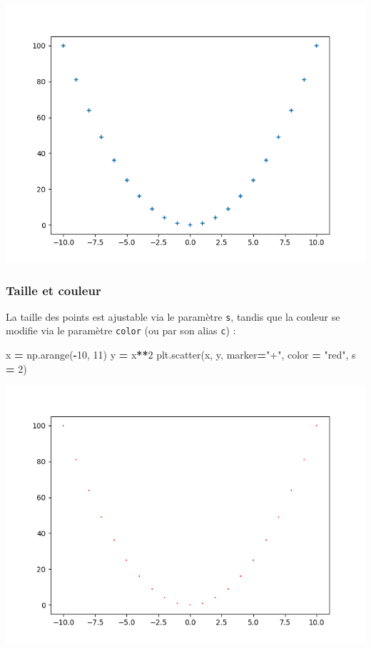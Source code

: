 \documentclass[12pt,]{book}
\newenvironment{Shaded}{\begin{snugshade}}{\end{snugshade}}
\newcommand{\DecValTok}[1]{\textcolor[rgb]{0.00,0.00,0.81}{#1}}
\newcommand{\StringTok}[1]{\textcolor[rgb]{0.31,0.60,0.02}{#1}}
\newcommand{\OperatorTok}[1]{\textcolor[rgb]{0.81,0.36,0.00}{\textbf{#1}}}
\newcommand{\NormalTok}[1]{#1}
\numberwithin{equation}{section}
\numberwithin{countremarque}{section}
\begin{document}
\begin{center}\includegraphics[width=9.03in]{figs/pyplot/scatter_2} \end{center}

\subsubsection{Taille et couleur}\label{taille-et-couleur}

La taille des points est ajustable via le paramètre \texttt{s}, tandis
que la couleur se modifie via le paramètre \texttt{color} (ou par son
alias \texttt{c}) :

\begin{Shaded}
\begin{Highlighting}[]
\NormalTok{x }\OperatorTok{=}\NormalTok{ np.arange(}\OperatorTok{-}\DecValTok{10}\NormalTok{, }\DecValTok{11}\NormalTok{)}
\NormalTok{y }\OperatorTok{=}\NormalTok{ x}\OperatorTok{**}\DecValTok{2}
\NormalTok{plt.scatter(x, y, marker}\OperatorTok{=}\StringTok{"+"}\NormalTok{, color }\OperatorTok{=} \StringTok{"red"}\NormalTok{, s }\OperatorTok{=} \DecValTok{2}\NormalTok{)}
\end{Highlighting}
\end{Shaded}

\begin{center}\includegraphics[width=9.03in]{figs/pyplot/scatter_3} \end{center}
\end{document}
